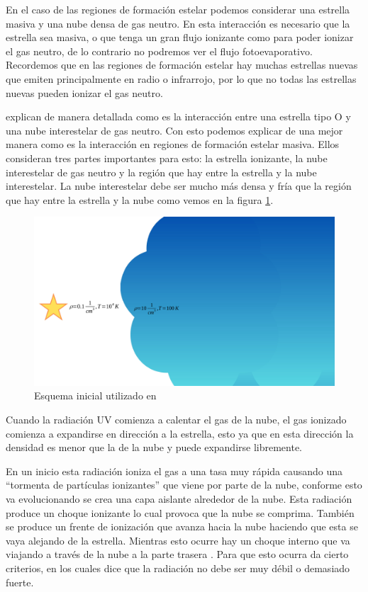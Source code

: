 \documentclass{book}
\begin{document}
En el caso de las regiones de formación estelar podemos considerar una estrella masiva y una nube densa de gas neutro. En esta interacción es necesario que la estrella sea masiva, o que tenga un gran flujo ionizante como para poder ionizar el gas neutro, de lo contrario no podremos ver el flujo fotoevaporativo. Recordemos que en las regiones de formación estelar hay muchas estrellas nuevas que emiten principalmente en radio o infrarrojo, por lo que no todas las estrellas nuevas pueden ionizar el gas neutro.

\cite{OortySpitzer_1955} explican de manera detallada como es la interacción entre una estrella tipo O y una nube interestelar de gas neutro. Con esto podemos explicar de una mejor manera como es la interacción en regiones de formación estelar masiva. Ellos consideran tres partes importantes para esto: la estrella ionizante, la nube interestelar de gas neutro y la región que hay entre la estrella y la nube interestelar. La nube interestelar debe ser mucho más densa y fría que la región que hay entre la estrella y la nube como vemos en la figura \ref{kahn_zones}.

\begin{figure}[h]
    \centering
    \includegraphics[width= \textwidth]{artesanales/ImgFi01-5.pdf}
    \caption{Esquema inicial utilizado en \cite{Kahn:1954}}
    \label{kahn_zones}
\end{figure}

Cuando la radiación UV comienza a calentar el gas de la nube, el gas ionizado comienza a expandirse en dirección a la estrella, esto ya que en esta dirección la densidad es menor que la de la nube y puede expandirse libremente. 

En un inicio esta radiación ioniza el gas a una tasa muy rápida causando una ``tormenta de partículas ionizantes'' que viene por parte de la nube, conforme esto va evolucionando se crea una capa aislante alrededor de la nube. Esta radiación produce un choque ionizante lo cual provoca que la nube se comprima. También se produce un frente de ionización que avanza hacia la nube haciendo que esta se vaya alejando de la estrella. Mientras esto ocurre hay un choque interno que va viajando a través de la nube a la parte trasera \citep{Bertoldi_1989}. Para que esto ocurra \cite{Kahn:1954} da cierto criterios, en los cuales dice que la radiación no debe ser muy débil o demasiado fuerte.
\end{document}
